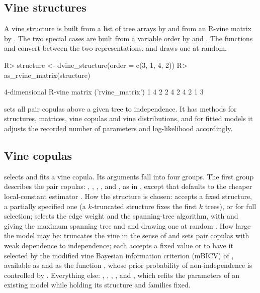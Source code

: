 \documentclass[article]{jss}
\begin{document}
\subsection{Vine structures}\label{sec:structure-usage}

A vine structure is built from a list of tree arrays by
 and from an R-vine matrix by
.  The two special cases are built from a variable
order by  and .  The functions
 and  convert between
the two representations, and  draws one at
random.

\begin{CodeChunk}
\begin{CodeInput}
R> structure <- dvine_structure(order = c(3, 1, 4, 2))
R> as_rvine_matrix(structure)
\end{CodeInput}
\begin{CodeOutput}
4-dimensional R-vine matrix ('rvine_matrix')
1 4 2 2
4 2 4
2 1
3
\end{CodeOutput}
\end{CodeChunk}

 sets all pair copulas above a given tree to
independence.  It has methods for structures, matrices, vine copulas and vine
distributions, and for fitted models it adjusts the recorded number of
parameters and log-likelihood accordingly.

\subsection{Vine copulas}\label{sec:vinecop}

 selects and fits a vine copula.  Its arguments fall into four
groups.  The first group describes the pair copulas:
, , , ,
 and , as in , except that  defaults to the
cheaper local-constant estimator .  How the structure is
chosen:  accepts a fixed structure, a partially specified one
(a $k$-truncated structure fixes the first $k$ trees), or  for full
selection;  selects the edge weight and
 the spanning-tree algorithm, with 
and  giving the maximum spanning tree and
 and  drawing one at
random \citep{vatter2025}.  How large the model may be: 
truncates the vine in the sense of \citet{brechmann2012} and 
sets pair copulas with weak dependence to independence; each accepts a fixed
value or  to have it selected by the modified vine Bayesian
information criterion (mBICV) of \citet{nagler2019}, available as
 and as the function , whose prior
probability of non-independence is controlled by .  Everything
else: , , , ,
and , which refits the parameters of an existing model
while holding its structure and families fixed.
\end{document}
